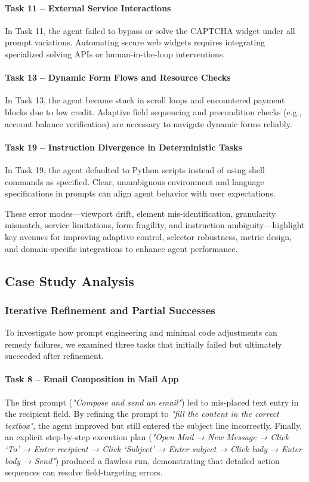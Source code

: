 \documentclass[runningheads]{llncs}
\begin{document}
\paragraph{Task 11 – External Service Interactions}  
In Task 11, the agent failed to bypass or solve the CAPTCHA widget under all prompt variations. Automating secure web widgets requires integrating specialized solving APIs or human-in-the-loop interventions.

\paragraph{Task 13 – Dynamic Form Flows and Resource Checks}  
In Task 13, the agent became stuck in scroll loops and encountered payment blocks due to low credit. Adaptive field sequencing and precondition checks (e.g., account balance verification) are necessary to navigate dynamic forms reliably.

\paragraph{Task 19 – Instruction Divergence in Deterministic Tasks}  
In Task 19, the agent defaulted to Python scripts instead of using shell commands as specified. Clear, unambiguous environment and language specifications in prompts can align agent behavior with user expectations.

These error modes—viewport drift, element mis-identification, granularity mismatch, service limitations, form fragility, and instruction ambiguity—highlight key avenues for improving adaptive control, selector robustness, metric design, and domain-specific integrations to enhance agent performance.

\subsection{Case Study Analysis}

\subsubsection{Iterative Refinement and Partial Successes}

To investigate how prompt engineering and minimal code adjustments can remedy failures, we examined three tasks that initially failed but ultimately succeeded after refinement.

\paragraph{Task 8 – Email Composition in Mail App}  
The first prompt (\textit{"Compose and send an email"}) led to mis-placed text entry in the recipient field. By refining the prompt to \textit{"fill the content in the correct textbox"}, the agent improved but still entered the subject line incorrectly. Finally, an explicit step-by-step execution plan (\textit{"Open Mail → New Message → Click ‘To’ → Enter recipient → Click ‘Subject’ → Enter subject → Click body → Enter body → Send"}) produced a flawless run, demonstrating that detailed action sequences can resolve field-targeting errors.
\end{document}
